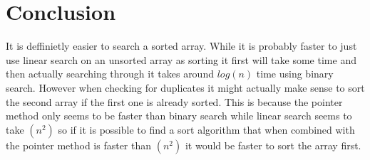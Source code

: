 \documentclass[a4paper,11pt]{article}
\begin{document}
\section*{Conclusion}
It is deffinietly easier to search a sorted array. While it is probably faster to just use linear search on an unsorted array as sorting it first will take some time and then actually 
searching through it takes around $log(n)$ time using binary search. However when checking for duplicates it might actually make sense to sort the second array if the first one is already sorted.
This is because the pointer method only seems to be faster than binary search while linear search seems to take $(n^2)$ so if it is possible to find a sort algorithm that when combined with the pointer method is faster
than $(n^2)$ it would be faster to sort the array first.



\newpage
\end{document}
